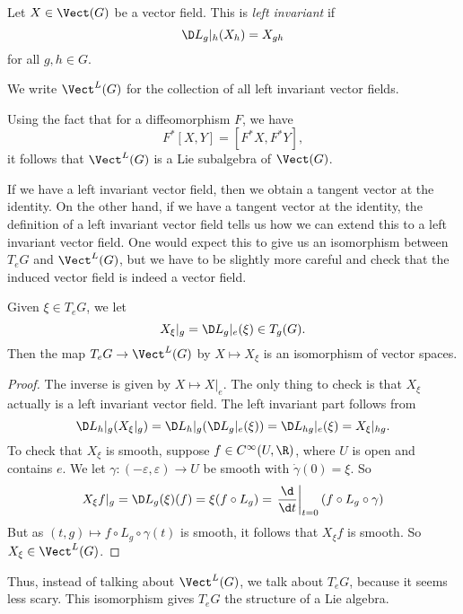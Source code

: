 \documentclass[a4paper]{article}
\begin{document}
\begin{defi}
  Let $X \in \Vect(G)$ be a vector field. This is \emph{left invariant} if
  \[
    \D L_g|_h (X_h) = X_{gh}
  \]
  for all $g,h \in G$.

  We write $\Vect^L(G)$ for the collection of all left invariant vector fields.
\end{defi}

Using the fact that for a diffeomorphism $F$, we have
\[
  F^*[X, Y] = [F^* X, F^* Y],
\]
it follows that $\Vect^L(G)$ is a Lie subalgebra of $\Vect(G)$.

If we have a left invariant vector field, then we obtain a tangent vector at the identity. On the other hand, if we have a tangent vector at the identity, the definition of a left invariant vector field tells us how we can extend this to a left invariant vector field. One would expect this to give us an isomorphism between $T_e G$ and $\Vect^L(G)$, but we have to be slightly more careful and check that the induced vector field is indeed a vector field.

\begin{lemma}
  Given $\xi \in T_e G$, we let
  \[
    X_\xi|_g = \D L_g|_e(\xi) \in T_g(G).
  \]
  Then the map $T_e G \to \Vect^L(G)$ by $X \mapsto X_\xi$ is an isomorphism of vector spaces.
\end{lemma}

\begin{proof}
  The inverse is given by $X \mapsto X|_e$. The only thing to check is that $X_\xi$ actually is a left invariant vector field. The left invariant part follows from
  \[
    \D L_h|_g (X_\xi|_g) = \D L_h|_g (\D L_g|_e (\xi)) = \D L_{hg}|_e(\xi) = X_\xi |_{hg}.
  \]
  To check that $X_\xi$ is smooth, suppose $f \in C^\infty(U, \R)$, where $U$ is open and contains $e$. We let $\gamma: (-\varepsilon, \varepsilon) \to U$ be smooth with $\dot{\gamma}(0) = \xi$. So
  \[
    X_\xi f|_g = \D L_g (\xi)(f) = \xi(f \circ L_g) = \left.\frac{\d}{\d t}\right|_{t = 0} (f \circ L_g \circ \gamma)
  \]
  But as $(t, g) \mapsto f \circ L_g \circ \gamma(t)$ is smooth, it follows that $X_\xi f$ is smooth. So $X_\xi \in \Vect^L(G)$.
\end{proof}

Thus, instead of talking about $\Vect^L(G)$, we talk about $T_e G$, because it seems less scary. This isomorphism gives $T_eG$ the structure of a Lie algebra.
\end{document}
